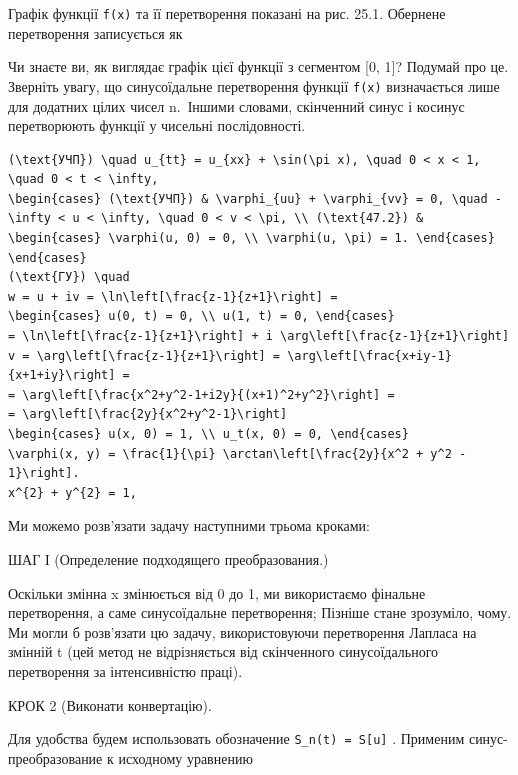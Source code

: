 \documentclass[
  ukrainian,
]{article}
\begin{document}
Графік функції \texttt{f(x)} та її перетворення показані на рис. 25.1.
Обернене перетворення записується як

Чи знаєте ви, як виглядає графік цієї функції з сегментом {[}0, 1{]}?
Подумай про це. Зверніть увагу, що синусоїдальне перетворення функції
\texttt{f(x)} визначається лише для додатних цілих чисел n.~Іншими
словами, скінченний синус і косинус перетворюють функції у чисельні
послідовності.

\begin{verbatim}
(\text{УЧП}) \quad u_{tt} = u_{xx} + \sin(\pi x), \quad 0 < x < 1, \quad 0 < t < \infty,
\begin{cases} (\text{УЧП}) & \varphi_{uu} + \varphi_{vv} = 0, \quad -\infty < u < \infty, \quad 0 < v < \pi, \\ (\text{47.2}) & \begin{cases} \varphi(u, 0) = 0, \\ \varphi(u, \pi) = 1. \end{cases} \end{cases}
(\text{ГУ}) \quad
w = u + iv = \ln\left[\frac{z-1}{z+1}\right] =
\begin{cases} u(0, t) = 0, \\ u(1, t) = 0, \end{cases}
= \ln\left[\frac{z-1}{z+1}\right] + i \arg\left[\frac{z-1}{z+1}\right]
v = \arg\left[\frac{z-1}{z+1}\right] = \arg\left[\frac{x+iy-1}{x+1+iy}\right] =
= \arg\left[\frac{x^2+y^2-1+i2y}{(x+1)^2+y^2}\right] =
= \arg\left[\frac{2y}{x^2+y^2-1}\right]
\begin{cases} u(x, 0) = 1, \\ u_t(x, 0) = 0, \end{cases}
\varphi(x, y) = \frac{1}{\pi} \arctan\left[\frac{2y}{x^2 + y^2 - 1}\right].
x^{2} + y^{2} = 1,
\end{verbatim}

Ми можемо розв'язати задачу наступними трьома кроками:

ШАГ І (Определение подходящего преобразования.)

Оскільки змінна x змінюється від 0 до 1, ми використаємо фінальне
перетворення, а саме синусоїдальне перетворення; Пізніше стане
зрозуміло, чому. Ми могли б розв'язати цю задачу, використовуючи
перетворення Лапласа на змінній t (цей метод не відрізняється від
скінченного синусоїдального перетворення за інтенсивністю праці).

КРОК 2 (Виконати конвертацію).

Для удобства будем использовать обозначение
\texttt{S\_n(t)\ =\ S{[}u{]}} . Применим синус-преобразование к
исходному уравнению
\end{document}
